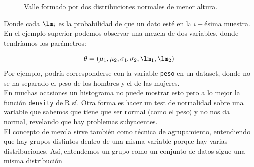 \begin{ejemplo}
\begin{figure}[h]
\centering
{}
\caption{Valle formado por dos distribuciones normales de menor altura.}
\label{fig:valle_normales}
\end{figure}

Donde cada $\lm_i$ es la probabilidad de que un dato esté en la $i-$ésima muestra. En el ejemplo superior podemos observar una mezcla de dos variables, donde tendríamos los parámetros:
\end{ejemplo}

\begin{equation*}
    \theta = (\mu_1,\mu_2,\sigma_1,\sigma_2,\lm_1,\lm_2)
\end{equation*}
Por ejemplo, podría corresponderse con la variable \texttt{peso} en un dataset, donde no se ha separado el peso de los hombres y el de las mujeres.\\

\noindent
En muchas ocasiones un histograma no puede mostrar esto pero a lo mejor la función \texttt{density} de R sí. Otra forma es hacer un test de normalidad sobre una variable que sabemos que tiene que ser normal (como el peso) y no nos da normal, revelando que hay problemas subyacentes.\\

\noindent
El concepto de mezcla sirve también como técnica de agrupamiento, entendiendo que hay grupos distintos dentro de una misma variable porque hay varias distribuciones. Así, entendemos un grupo como un conjunto de datos sigue una misma distribución.\\

